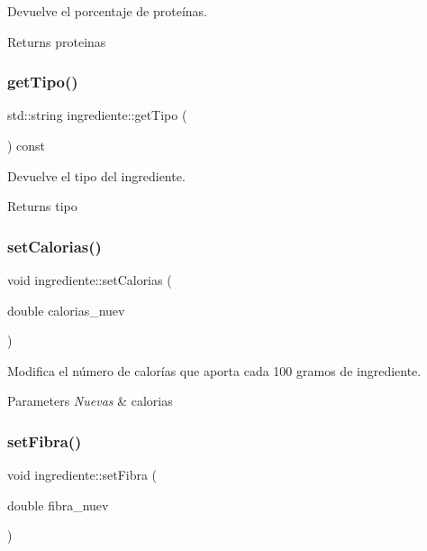 Devuelve el porcentaje de proteínas. 

\begin{DoxyReturn}{Returns}
proteinas 
\end{DoxyReturn}
\mbox{\label{classingrediente_a888b76c50c107d6ebdb6acf6afea631b}} 
\subsubsection{\texorpdfstring{get\+Tipo()}{getTipo()}}
{\footnotesize\ttfamily std\+::string ingrediente\+::get\+Tipo (\begin{DoxyParamCaption}{ }\end{DoxyParamCaption}) const}



Devuelve el tipo del ingrediente. 

\begin{DoxyReturn}{Returns}
tipo 
\end{DoxyReturn}
\mbox{\label{classingrediente_ab4d582503a247a6b85e6479cc3932341}} 
\subsubsection{\texorpdfstring{set\+Calorias()}{setCalorias()}}
{\footnotesize\ttfamily void ingrediente\+::set\+Calorias (\begin{DoxyParamCaption}\item[{double}]{calorias\+\_\+nuev }\end{DoxyParamCaption})}



Modifica el número de calorías que aporta cada 100 gramos de ingrediente. 


\begin{DoxyParams}{Parameters}
{\em Nuevas} & calorias \\
\hline
\end{DoxyParams}
\mbox{\label{classingrediente_ab7a915b7409d0ab8c585b315610da15d}} 
\subsubsection{\texorpdfstring{set\+Fibra()}{setFibra()}}
{\footnotesize\ttfamily void ingrediente\+::set\+Fibra (\begin{DoxyParamCaption}\item[{double}]{fibra\+\_\+nuev }\end{DoxyParamCaption})}



